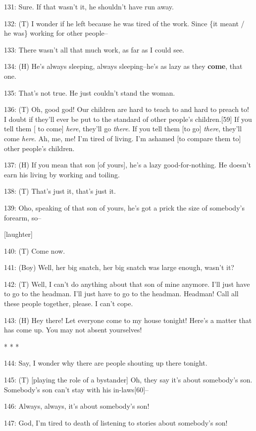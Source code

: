 131: Sure. If that wasn't it, he shouldn't have run away.

132: (T) I wonder if he left because he was tired of the work. Since \{it meant
/ he was\} working for other people--

133: There wasn't all that much work, as far as I could see.

134: (H) He's always sleeping, always sleeping--he's as lazy as they \textbf{come},
that one.

135: That's not true. He just couldn't stand the woman.

136: (T) Oh, good god! Our children are hard to teach to and hard to preach to!
I doubt if they'll ever be put to the standard of other people's children.[59]
If you tell them [ to come] \textit{here}, they'll go \textit{there}. If you tell
them [to go] \textit{there}, they'll come \textit{here}. Ah, me, me! I'm tired
of living. I'm ashamed [to compare them to] other people's children.

137: (H) If you mean that son [of yours], he's a lazy good-for-nothing. He doesn't
earn his living by working and toiling.

138: (T) That's just it, that's just it.

139: Oho, speaking of that son of yours, he's got a prick the size of somebody's
forearm, so--

[laughter]

140: (T) Come now.

141: (Boy) Well, her big snatch, her big snatch was large enough, wasn't it?

142: (T) Well, I can't do anything about that son of mine anymore. I'll just have
to go to the headman. I'll just have to go to the headman. Headman! Call all these
people together, please. I can't cope.

143: (H) Hey there! Let everyone come to my house tonight! Here's a matter that
has come up. You may not absent yourselves!

\begin{center}
* * *
\end{center}

\leftskip=0pt
144: Say, I wonder why there are people shouting up there tonight.

145: (T) [playing the role of a bystander] Oh, they say it's about somebody's son.
Somebody's son can't stay with his in-laws[60]--

146: Always, always, it's about somebody's son!

147: God, I'm tired to death of listening to stories about somebody's son!

